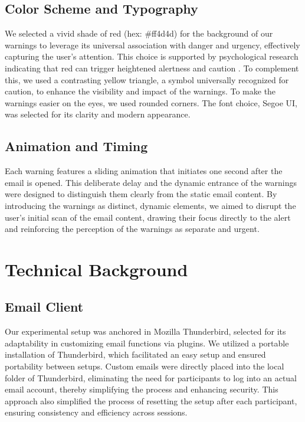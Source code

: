 \documentclass[
  a4paper,  %
  twoside,  %
  bibliography=totoc,
  headsepline,
  cleardoublepage=empty,
  parskip=half,
  draft=false
]{scrbook}
\begin{document}
\subsection{Color Scheme and Typography}
We selected a vivid shade of red (hex: \#ff4d4d) for the background of our warnings to leverage its universal association with danger and urgency, effectively capturing the user's attention. This choice is supported by psychological research indicating that red can trigger heightened alertness and caution \cite{kuniecki}. To complement this, we used a contrasting yellow triangle, a symbol universally recognized for caution, to enhance the visibility and impact of the warnings. To make the warnings easier on the eyes, we used rounded corners.
The font choice, Segoe UI, was selected for its clarity and modern appearance. 

\subsection{Animation and Timing}
Each warning features a sliding animation that initiates one second after the email is opened. This deliberate delay and the dynamic entrance of the warnings were designed to distinguish them clearly from the static email content. By introducing the warnings as distinct, dynamic elements, we aimed to disrupt the user's initial scan of the email content, drawing their focus directly to the alert and reinforcing the perception of the warnings as separate and urgent.

\section{Technical Background}

\subsection{Email Client}
Our experimental setup was anchored in Mozilla Thunderbird, selected for its adaptability in customizing email functions via plugins. We utilized a portable installation of Thunderbird, which facilitated an easy setup and ensured portability between setups. Custom emails were directly placed into the local folder of Thunderbird, eliminating the need for participants to log into an actual email account, thereby simplifying the process and enhancing security. This approach also simplified the process of resetting the setup after each participant, ensuring consistency and efficiency across sessions.
\end{document}
